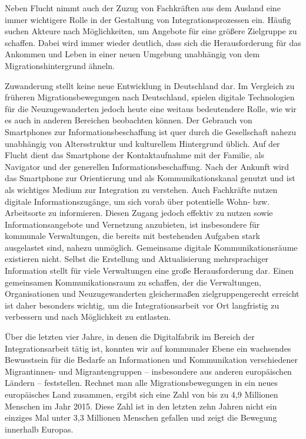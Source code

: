 \documentclass[12pt, a4paper]{article} %
\begin{document}
Neben Flucht nimmt auch der Zuzug von Fachkräften aus dem Ausland eine
immer wichtigere Rolle in der Gestaltung von Integrationsprozessen ein.
Häufig suchen Akteure nach Möglichkeiten, um Angebote für eine größere
Zielgruppe zu schaffen. Dabei wird immer wieder deutlich, dass sich die
Herausforderung für das Ankommen und Leben in einer neuen Umgebung
unabhängig von dem Migrationshintergrund ähneln.

Zuwanderung stellt keine neue Entwicklung in Deutschland dar. Im
Vergleich zu früheren Migrationsbewegungen nach Deutschland, spielen
digitale Technologien für die Neuzugewanderten jedoch heute eine weitaus
bedeutendere Rolle, wie wir es auch in anderen Bereichen beobachten
können. Der Gebrauch von Smartphones zur Informationsbeschaffung ist
quer durch die Gesellschaft nahezu unabhängig von Altersstruktur und
kulturellem Hintergrund üblich. Auf der Flucht dient das Smartphone der
Kontaktaufnahme mit der Familie, als Navigator und der generellen
Informationsbeschaffung. Nach der Ankunft wird das Smartphone zur
Orientierung und als Kommunikationskanal genutzt und ist als wichtiges
Medium zur Integration zu verstehen. Auch Fachkräfte nutzen digitale
Informationszugänge, um sich vorab über potentielle Wohn- bzw.
Arbeitsorte zu informieren. Diesen Zugang jedoch effektiv zu nutzen
sowie Informationsangebote und Vernetzung anzubieten, ist insbesondere
für kommunale Verwaltungen, die bereits mit bestehenden Aufgaben stark
ausgelastet sind, nahezu unmöglich. Gemeinsame digitale
Kommunikationsräume existieren nicht. Selbst die Erstellung und
Aktualisierung mehrsprachiger Information stellt für viele Verwaltungen
eine große Herausforderung dar. Einen gemeinsamen Kommunikationsraum zu
schaffen, der die Verwaltungen, Organisationen und Neuzugewanderten
gleichermaßen zielgruppengerecht erreicht ist daher besonders wichtig,
um die Integrationsarbeit vor Ort langfristig zu verbessern und nach
Möglichkeit zu entlasten.

Über die letzten vier Jahre, in denen die Digitalfabrik im Bereich der
Integrationsarbeit tätig ist, konnten wir auf kommunaler Ebene ein
wachsendes Bewusstsein für die Bedarfe an Informationen und
Kommunikation verschiedener Migrantinnen- und Migrantengruppen –
insbesondere aus anderen europäischen Ländern – feststellen. Rechnet man
alle Migrationsbewegungen in ein neues europäisches Land zusammen,
ergibt sich eine Zahl von bis zu 4,9 Millionen Menschen im Jahr 2015.
Diese Zahl ist in den letzten zehn Jahren nicht ein einziges Mal unter
3,3 Millionen Menschen gefallen und zeigt die Bewegung innerhalb
Europas.
\end{document}
